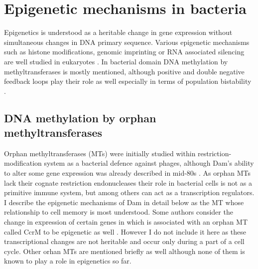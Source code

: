 \section{Epigenetic mechanisms in bacteria}
Epigenetics is understood as a heritable change in gene expression without simultaneous changes in DNA primary sequence.
Various epigenetic mechanisms such as histone modifications, genomic imprinting or RNA associated silencing are well studied in eukaryotes \cite{durso2014mechanisms}.
In bacterial domain DNA methylation by methyltransferases is mostly mentioned, although positive and double negative feedback loops play their role as well especially in terms of population bistability \cite{casadesus2006epigenetic, casadesus2013programmed, adhikari2016dna}.

\subsection{DNA methylation by orphan methyltransferases}
Orphan methyltransferases (MTs) were initially studied within restriction-modification system as a bacterial defence against phages, although Dam's ability to alter some gene expression was already described in mid-80s \cite{sternberg1985evidence, bickle1993biology}.
As orphan MTs lack their cognate restriction endonucleases their role in bacterial cells is not as a primitive immune system, but among others can act as a transcription regulators.
I describe the epigenetic mechanisms of Dam in detail below as the MT whose relationship to cell memory is most understood.
Some authors consider the change in expression of certain genes in  which is associated with an orphan MT called CcrM to be epigenetic as well \cite{casadesus2006epigenetic, adhikari2016dna}.
However I do not include it here as these transcriptional changes are not heritable and occur only during a part of a cell cycle.
Other  orhan MTs are mentioned briefly as well although none of them is known to play a role in epigenetics so far.

